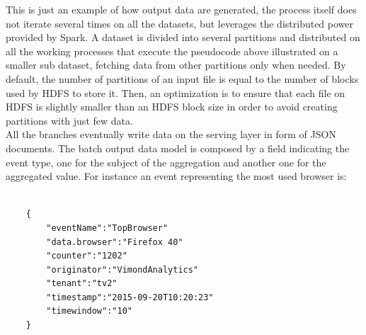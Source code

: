 \begin{algorithm}[H]
\DontPrintSemicolon
{}
\caption{End events per asset aggregation\label{IR}}
\end{algorithm}
\bigskip
This is just an example of how output data are generated, the process itself does not iterate several times on all the datasets, but leverages the distributed power provided by Spark. A dataset is divided into several partitions and distributed on all the working processes that execute the pseudocode above illustrated on a smaller sub dataset, fetching data from other partitions only when needed. By default, the number of partitions of an input file is equal to the number of blocks used by HDFS to store it. Then, an optimization is to ensure that each file on HDFS is slightly smaller than an HDFS block size in order to avoid creating partitions with just few data. \\
All the branches eventually write data on the serving layer in form of JSON documents. The batch output data model is composed by a field indicating the event type, one for the subject of the aggregation and another one for the aggregated value. For instance an event representing the most used browser is: 
\begin{listing}
\begin{verbatim}
               
    {
    	"eventName":"TopBrowser"
    	"data.browser":"Firefox 40"
    	"counter":"1202"
    	"originator":"VimondAnalytics"
    	"tenant":"tv2"
    	"timestamp":"2015-09-20T10:20:23"
    	"timewindow":"10"
    }             
\end{verbatim}
\caption{Top browsers output event} 
\label{top-browser}
\end{listing}

